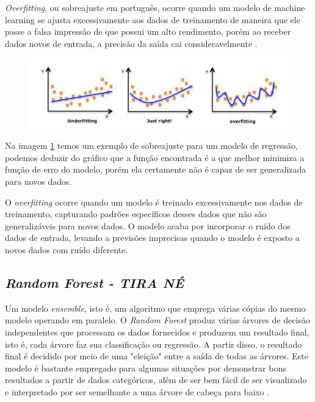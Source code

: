 \textit{Overfitting}, ou sobreajuste em português, ocorre quando um modelo de machine learning se ajusta excessivamente aos dados de treinamento de maneira que ele passe a falsa impressão de que possui um alto rendimento, porém ao receber dados novos de entrada, a precisão da saída cai consideravelmente \cite{overftt}.

\begin{figure}[htb]
	\centering
	\begin{minipage}{0.9\linewidth}
		\centering
		\includegraphics[width=\linewidth]{tg1/figuras/overfiting.png}
		\caption{
            \cite{overftt}} \label{fig:overftt}
	\end{minipage}
\end{figure}

Na imagem \ref{fig:overftt} temos um exemplo de sobreajuste para um modelo de regressão, podemos deduzir do gráfico que a função encontrada é a que melhor minimiza a função de erro do modelo, porém ela certamente não é capaz de ser generalizada para novos dados.

O \textit{overfitting} ocorre quando um modelo é treinado excessivamente nos dados de treinamento, capturando padrões específicos desses dados que não são generalizáveis para novos dados. O modelo acaba por incorporar o ruído dos dados de entrada, levando a previsões imprecisas quando o modelo é exposto a novos dados com ruído diferente.



\subsection{\textbf{\textit{Random Forest - TIRA NÉ}}}

Um modelo \textit{ensemble}, isto é, um algoritmo que emprega várias cópias do mesmo modelo operando em paralelo. O \textit{Random Forest} produz várias árvores de decisão independentes que processam os dados fornecidos e produzem um resultado final, isto é, cada árvore faz sua classificação ou regressão. A partir disso, o resultado final é decidido por meio de uma "eleição" entre
a saída de todas as árvores. Este modelo é bastante empregado para algumas situações por demonstrar bons resultados a partir de dados categóricos, além de ser bem fácil de ser visualizado e interpretado por ser semelhante a uma árvore de cabeça para baixo \cite{oreillyML}.

